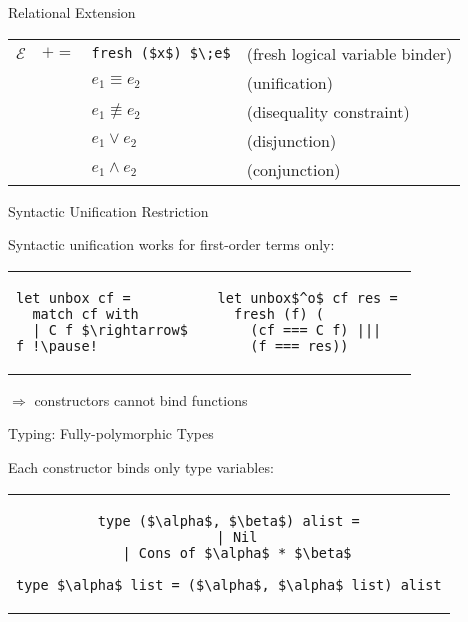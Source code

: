 \documentclass{beamer}
\let\\\tabularnewline
\let\\\tabularnewline
\theoremstyle{definition}
\begin{document}
\begin{frame}[fragile]{Relational Extension}
\begin{tabular}{rcll}
  $\mathcal E$ & $+=$ &\lstinline|fresh ($x$) $\;e$| &(fresh logical variable binder) \\
               &           &$e_1\equiv e_2$               & (unification)                   \\
               &           &$e_1\not\equiv e_2$           & (disequality constraint)        \\
               &           &$e_1\vee e_2$                 & (disjunction)                   \\
               &           &$e_1\wedge e_2$               & (conjunction)

\end{tabular}
\end{frame}

\begin{frame}[fragile]{Syntactic Unification Restriction}

 \begin{center}
 Syntactic unification works for first-order terms only:
 \pause\vskip5mm
  \begin{tabular}{m{0.4\linewidth}m{0.4\linewidth}}
   \begin{lstlisting}
let unbox cf =
  match cf with
  | C f $\rightarrow$ f !\pause!
   \end{lstlisting} &
   \begin{lstlisting}
let unbox$^o$ cf res =
  fresh (f) (
    (cf === C f) |||
    (f === res))
   \end{lstlisting}
  \end{tabular}
 \pause \vskip5mm
 $\Rightarrow$ constructors cannot bind functions 
 \end{center}
\end{frame}

\begin{frame}[fragile]{Typing: Fully-polymorphic Types}

\begin{center}
Each constructor binds only type variables:

\vskip5mm

\begin{tabular}{c}
\begin{lstlisting}
type ($\alpha$, $\beta$) alist =
  | Nil
  | Cons of $\alpha$ * $\beta$

type $\alpha$ list = ($\alpha$, $\alpha$ list) alist
\end{lstlisting}
\end{tabular}
\end{center}
\end{frame}
\end{document}
